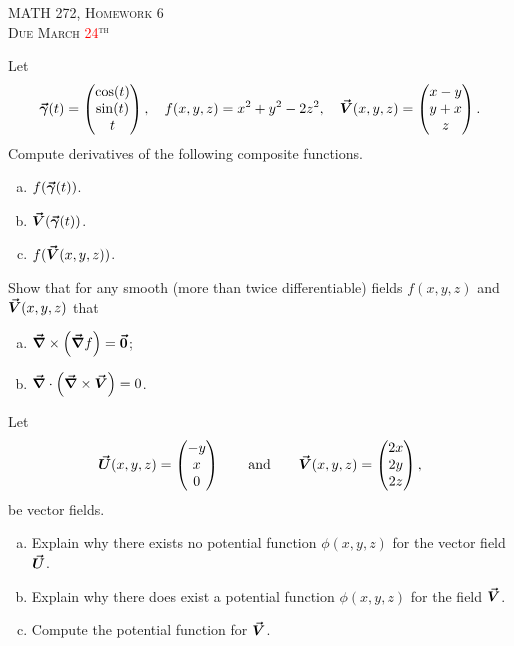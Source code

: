 \documentclass[12pt]{article} %
\begin{document}
\begin{center}
   \textsc{\large MATH 272, Homework 6}\\
   \textsc{Due March \textcolor{red}{24}$^\textrm{th}$}
\end{center}
\vspace{.5cm}


\begin{problem} 
Let 
\[
\boldsymbol{\vec{\gamma}}(t) = \begin{pmatrix} \cos(t) \\ \sin(t) \\ t \end{pmatrix}, \quad f(x,y,z) = x^2 + y^2 - 2z^2, \quad \boldsymbol{\vec{V}}(x,y,z) = \begin{pmatrix} x-y \\ y+x \\ z \end{pmatrix}.
\]
Compute derivatives of the following composite functions.
\begin{enumerate}[(a)]
	\item $f(\boldsymbol{\vec{\gamma}}(t))$.
	\item $\boldsymbol{\vec{V}}(\boldsymbol{\vec{\gamma}}(t))$.
	\item $f(\boldsymbol{\vec{V}}(x,y,z))$.
\end{enumerate}
\end{problem}

\begin{problem}
Show that for any smooth (more than twice differentiable) fields $f(x,y,z)$ and $\boldsymbol{\vec{V}}(x,y,z)$ that
\begin{enumerate}[(a)]
	\item $\boldsymbol{\vec{\nabla}} \times \left(\boldsymbol{\vec{\nabla}} f\right)=\boldsymbol{\vec{0}}$;
	\item $\boldsymbol{\vec{\nabla}} \cdot \left(\boldsymbol{\vec{\nabla}} \times \boldsymbol{\vec{V}}\right)=0$.
\end{enumerate}
\end{problem}

\begin{problem}
	Let 
	\[
	\boldsymbol{\vec{U}}(x,y,z) = \begin{pmatrix} -y \\ x \\ 0 \end{pmatrix} \qquad \textrm{and} \qquad \boldsymbol{\vec{V}}(x,y,z) = \begin{pmatrix} 2x \\ 2y \\ 2z \end{pmatrix},
	\] 
	be vector fields.  
	\begin{enumerate}[(a)]
		\item Explain why there exists no potential function $\phi(x,y,z)$ for the vector field $\boldsymbol{\vec{U}}$.
		\item Explain why there does exist a potential function $\phi(x,y,z)$ for the field $\boldsymbol{\vec{V}}$.
		\item Compute the potential function for $\boldsymbol{\vec{V}}$.
	\end{enumerate}
\end{problem}
\end{document}
